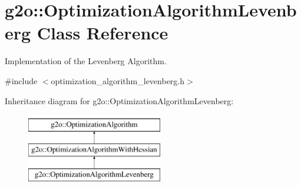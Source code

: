 \hypertarget{classg2o_1_1_optimization_algorithm_levenberg}{}\section{g2o\+:\+:Optimization\+Algorithm\+Levenberg Class Reference}
\label{classg2o_1_1_optimization_algorithm_levenberg}


Implementation of the Levenberg Algorithm.  




{\ttfamily \#include $<$optimization\+\_\+algorithm\+\_\+levenberg.\+h$>$}

Inheritance diagram for g2o\+:\+:Optimization\+Algorithm\+Levenberg\+:\begin{figure}[H]
\begin{center}
\leavevmode
\includegraphics[height=3.000000cm]{classg2o_1_1_optimization_algorithm_levenberg}
\end{center}
\end{figure}
